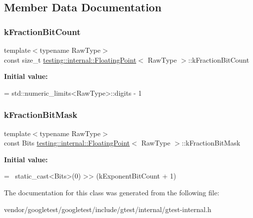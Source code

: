 \subsection{Member Data Documentation}
\mbox{\label{classtesting_1_1internal_1_1_floating_point_a0b756a6d2a4f5f5b41ca79651c06c043}} 
\subsubsection{\texorpdfstring{k\+Fraction\+Bit\+Count}{kFractionBitCount}}
{\footnotesize\ttfamily template$<$typename Raw\+Type$>$ \\
const size\+\_\+t \hyperlink{classtesting_1_1internal_1_1_floating_point}{testing\+::internal\+::\+Floating\+Point}$<$ Raw\+Type $>$\+::k\+Fraction\+Bit\+Count\hspace{0.3cm}{\ttfamily [static]}}

{\bfseries Initial value\+:}
\begin{DoxyCode}
=
    std::numeric\_limits<RawType>::digits - 1
\end{DoxyCode}
\mbox{\label{classtesting_1_1internal_1_1_floating_point_a0ac75d4ffd24f14bca452abe8a718da1}} 
\subsubsection{\texorpdfstring{k\+Fraction\+Bit\+Mask}{kFractionBitMask}}
{\footnotesize\ttfamily template$<$typename Raw\+Type$>$ \\
const Bits \hyperlink{classtesting_1_1internal_1_1_floating_point}{testing\+::internal\+::\+Floating\+Point}$<$ Raw\+Type $>$\+::k\+Fraction\+Bit\+Mask\hspace{0.3cm}{\ttfamily [static]}}

{\bfseries Initial value\+:}
\begin{DoxyCode}
=
    ~static\_cast<Bits>(0) >> (kExponentBitCount + 1)
\end{DoxyCode}


The documentation for this class was generated from the following file\+:\begin{DoxyCompactItemize}
\item 
vendor/googletest/googletest/include/gtest/internal/gtest-\/internal.\+h\end{DoxyCompactItemize}
